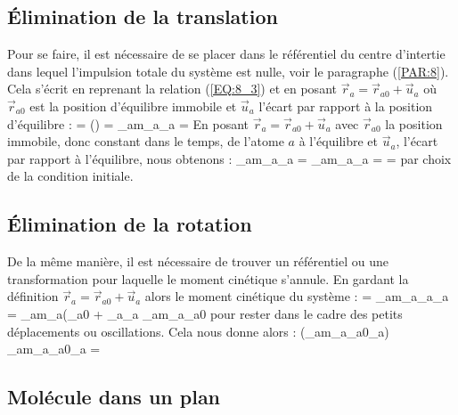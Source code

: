 \subsection{\'Elimination de la translation}

Pour se faire, il est n\'ecessaire de se placer dans le r\'ef\'erentiel du centre d'intertie dans lequel l'impulsion totale du syst\`eme est nulle, voir le paragraphe (\ref{PAR:8}). Cela s'\'ecrit en reprenant la relation (\ref{EQ:8_3}) et en posant $\vec{r}_{a} = \vec{r}_{a0} + \vec{u}_{a}$ o\`u $\vec{r}_{a0}$ est la position d'\'equilibre immobile et $\vec{u}_{a}$ l'\'ecart par rapport \`a la position d'\'equilibre :
\benn
	 = \left(\right) =  \Leftrightarrow \sum_{a}m_{a}_{a} = 
\eenn
En posant $\vec{r}_{a} = \vec{r}_{a0} + \vec{u}_{a}$ avec $\vec{r}_{a0}$ la position immobile, donc constant dans le temps, de l'atome $a$ \`a l'\'equilibre et $\vec{u}_{a}$, l'\'ecart par rapport \`a l'\'equilibre, nous obtenons :
\be
	\sum_{a}m_{a}_{a} =  \Leftrightarrow \sum_{a}m_{a}_{a} =  =  \label{EQ:24_1}
\ee
par choix de la condition initiale.

\subsection{\'Elimination de la rotation}

De la m\^eme mani\`ere, il est n\'ecessaire de trouver un r\'ef\'erentiel ou une transformation pour laquelle le moment cin\'etique s'annule. En gardant la d\'efinition $\vec{r}_{a} = \vec{r}_{a0} + \vec{u}_{a}$ alors le moment cin\'etique du syst\`eme :
\benn
	 = \sum_{a}m_{a}_{a}\wedge{}_{a} = \sum_{a}m_{a}(_{a0} + _{a}\wedge{}_{a} \approx \sum_{a}m_{a}_{a0}\wedge{}
\eenn
pour rester dans le cadre des petits d\'eplacements ou oscillations. Cela nous donne alors :
\be
	 \approx {}\left(\sum_{a}m_{a}_{a0}\wedge{}_{a}\right) \Rightarrow \sum_{a}m_{a}_{a0}\wedge{}_{a} =  \label{EQ:24_2}
\ee

\subsection{Mol\'ecule dans un plan}

